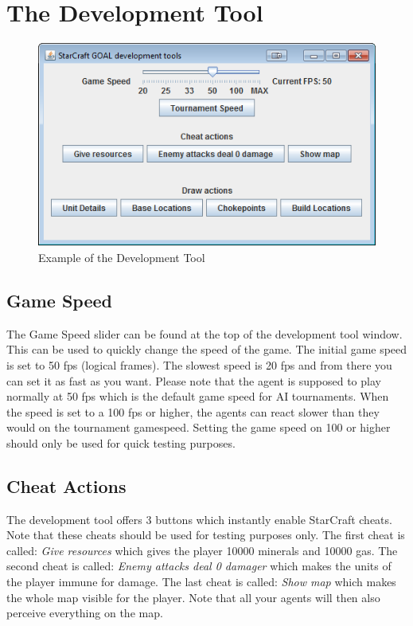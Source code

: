 \newpage
\section{The Development Tool}
\label{development tool}

\begin{figure}[h]
\includegraphics[width=1.0\textwidth]{images/developmentTool}
\caption{Example of the Development Tool}
\label{fig:StarCraft_picture}
\end{figure}

\subsection{Game Speed}
The Game Speed slider can be found at the top of the development tool window. This can be used to quickly change the speed of the game. The initial game speed is set to 50 fps (logical frames). The slowest speed is 20 fps and from there you can set it as fast as you want. Please note that the agent is supposed to play normally at 50 fps which is the default game speed for AI tournaments. When the speed is set to a 100 fps or higher, the agents can react slower than they would on the tournament gamespeed. Setting the game speed on 100 or higher should only be used for quick testing purposes.

\subsection{Cheat Actions}
The development tool offers 3 buttons which instantly enable StarCraft cheats. Note that these cheats should be used for testing purposes only. The first cheat is called: \textit{Give resources} which gives the player 10000 minerals and 10000 gas. The second cheat is called: \textit{Enemy attacks deal 0 damager} which makes the units of the player immune for damage. The last cheat is called: \textit{Show map} which makes the whole map visible for the player. Note that  all your agents will then also perceive everything on the map.

